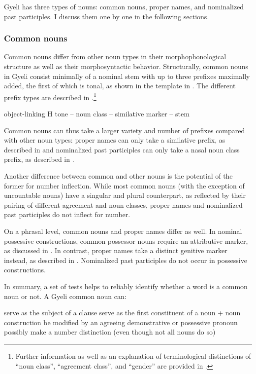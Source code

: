 \noindent Gyeli has three types of nouns: common nouns, proper names, and nominalized past participles. I discuss them one by one in the following sections.




\subsubsection{Common nouns}
\label{sec:commonN}

Common nouns differ from other noun types  in their morphophonological structure as well as their morphosyntactic behavior.
Structurally, common nouns in Gyeli consist minimally of a nominal stem with up to three prefixes maximally added, the first of which is tonal, as shown in the template in . The different prefix types are described in .\footnote{Further information as well as an explanation of terminological distinctions of ``noun class'', ``agreement class'', and ``gender'' are provided in .}

\ea  \label{Nstruc}  object-linking H tone -- noun class -- similative marker -- stem
\z

Common nouns can thus take a larger variety and number of prefixes compared with other noun types: proper names can only take a similative prefix, as described in  and nominalized past participles can only take a nasal noun class prefix, as described in .

Another difference between common and other nouns is the potential of the former for number inflection. While most common nouns (with the exception of uncountable nouns) have a singular and plural counterpart, as reflected by their pairing of different agreement and noun classes, proper names and nominalized past participles do not inflect for number.

On a phrasal level, common nouns and proper names differ as well. In nominal possessive constructions, common possessor nouns  require an attributive marker, as discussed in . In contrast, proper names take a distinct genitive marker instead, as described in . Nominalized past participles do not occur in possessive constructions.


In summary, a set of tests helps to reliably identify whether a word is a common noun or not. A Gyeli common noun can:

\begin{enumerate}
\itshapeem serve as the subject of a clause
\itshapeem serve as  the  first constituent of a noun + noun construction
\itshapeem be modified by an agreeing demonstrative or possessive pronoun
\itshapeem possibly make a number distinction (even though not all nouns do so) 
\end{enumerate}

